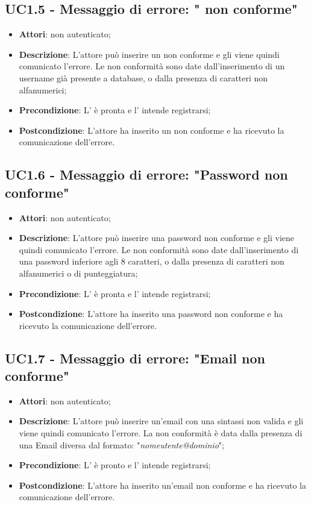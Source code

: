 \subsection{UC1.5 - Messaggio di errore: " non conforme"}
\label{ssec:UC1.5}
\begin{itemize}
\item \textbf{Attori}:  non autenticato;
\item \textbf{Descrizione}: L'attore può inserire un  non conforme e gli viene quindi comunicato l'errore. Le non conformità sono date dall'inserimento di un username già presente a database, o dalla presenza di caratteri non alfanumerici;
\item \textbf{Precondizione}: L' è pronta e l' intende registrarsi;
\item \textbf{Postcondizione}: L'attore ha inserito un  non conforme e ha ricevuto la comunicazione dell'errore.
\end{itemize}
\subsection{UC1.6 - Messaggio di errore: "Password non conforme"}
\label{ssec:UC1.6}
\begin{itemize}
\item \textbf{Attori}:  non autenticato;
\item \textbf{Descrizione}: L'attore può inserire una password non conforme e gli viene quindi comunicato l'errore. Le non conformità sono date dall'inserimento di una password inferiore agli 8 caratteri, o dalla presenza di caratteri non alfanumerici o di punteggiatura;
\item \textbf{Precondizione}: L' è pronta e l' intende registrarsi;
\item \textbf{Postcondizione}: L'attore ha inserito una password non conforme e ha ricevuto la comunicazione dell'errore.
\end{itemize}
\subsection{UC1.7 - Messaggio di errore: "Email non conforme"}
\label{ssec:UC1.7}
\begin{itemize}
\item \textbf{Attori}:  non autenticato;
\item \textbf{Descrizione}: L'attore può inserire un'email con una sintassi non valida e gli viene quindi comunicato l'errore. La non conformità è data dalla presenza di una Email diversa dal formato: "\emph{nomeutente@dominio}";
\item \textbf{Precondizione}: L' è pronto e l' intende registrarsi;
\item \textbf{Postcondizione}: L'attore ha inserito un'email non conforme e ha ricevuto la comunicazione dell'errore.
\end{itemize}
\newpage
